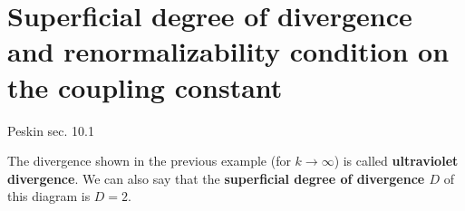 \documentclass[TheoreticalPhy_ModB.tex]{subfiles}
\begin{document}
\begin{example}
\end{example}

\section{Superficial degree of divergence and renormalizability condition on the coupling constant}
\textsf{Peskin sec. 10.1}

The divergence shown in the previous example (for $k\rightarrow\infty$) is called \textbf{ultraviolet divergence}. We can also say that the \textbf{superficial degree of divergence $D$} of this diagram is $D=2$.

\begin{exercise}
Verify that following diagrams are superficially divergent ($D\geq0$):
\onlyinsubfile{\begin{comment}}
\[
\begin{tikzpicture}[baseline=(e1)]
\begin{feynman}[small]
\vertex(e1);
\vertex[right=of e1](e2);
\vertex[right=of e2](e3);
\vertex[right=of e3](e4);
\diagram*{
	(e1)--[photon] (e2),
	(e2) -- [ half left]  (e3) -- [half left] (e2),
	(e3) -- [photon] (e4),
};
\end{feynman}
\end{tikzpicture}
%
\qquad
%
\begin{tikzpicture}[baseline=(e1)]
\begin{feynman}[small]
\vertex(e1);
\vertex[right=of e1](e2);
\vertex[right=of e2](e3);
\vertex[right=of e3](e4);
\diagram*{
	(e1) -- (e4),
	(e2) -- [photon, half left] (e3),
};
\end{feynman}
\end{tikzpicture}
%
\qquad
%
\begin{tikzpicture}[baseline=(e1)]
\begin{feynman}[small]
\vertex(e1);
\vertex[above left=of e1](e2);
\vertex[below left=of e1](e3);
\vertex[above left=0.5cm of e1](e4);
\vertex[below left=0.5cm of e1](e5);
\vertex[right=of e1](e6);
\diagram*{
	(e2) -- (e1) -- (e3),
	(e4) -- [photon] (e5),
	(e1) -- [photon] (e6),
};
\end{feynman}
\end{tikzpicture}%
\qquad
%
\begin{tikzpicture}[baseline=(e0)]
\begin{feynman}[small]
\vertex(e0);
\vertex[above=0.5cm of e0](e1);
\vertex[right=of e1](e2);
\vertex[below=of e2](e3);
\vertex[left=of e3](e4);
\vertex[left=of e1](e5);
\vertex[right=of e2](e6);
\vertex[right=of e3](e7);

\end{comment}}
\end{exercise}
\end{document}
